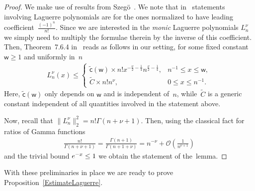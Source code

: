 \documentclass[11pt]{article}
\numberwithin{equation}{section}
\begin{document}
\begin{proof}We make use of results from Szeg\"{o}~\cite{Szego}. We note that in~\cite{Szego} statements involving Laguerre polynomials are for the ones normalized to have leading coefficient~$\frac{(-1)^n}{n!}$. Since we are interested in the \textit{monic} Laguerre polynomials $L_n^{\nu}$ we simply need to multiply the formulae therein by the inverse of this coefficient. Then, Theorem~7.6.4 in~\cite{Szego} reads as follows in our setting, for some fixed constant $\mathsf{w}\ge 1$ and uniformly in~$n$
\begin{gather*}
L_n^{\nu}(x)\le \begin{cases}
\tilde{\mathsf{c}}(\mathsf{w})\times n! x^{-\frac{\nu}{2}-\frac{1}{4}}n^{\frac{\nu}{2}-\frac{1}{4}}, & n^{-1}\le x \le \mathsf{w},\\
\tilde{C} \times n! n^{\nu}, & 0 \le x \le n^{-1}.
\end{cases}
\end{gather*}
Here, $\tilde{\mathsf{c}}(\mathsf{w})$ only depends on $\mathsf{w}$ and is independent of~$n$, while~$\tilde{C}$ is a generic constant independent of all quantities involved in the statement above.

Now, recall that $\|L_n^{\nu}\|_2^2=n! \Gamma(n+\nu+1)$. Then, using the classical fact for ratios of Gamma functions
\begin{gather*}
\frac{n!}{\Gamma(n+\nu+1)}=\frac{\Gamma(n+1)}{\Gamma(n+1+\nu)}= n^{-\nu}+\mathcal{O}\left(\frac{1}{n^{\nu+1}}\right)
\end{gather*}
and the trivial bound ${\rm e}^{-x}\le 1$ we obtain the statement of the~lemma.
\end{proof}

With these preliminaries in place we are ready to prove Proposition~\ref{EstimateLaguerre}.
\end{document}
